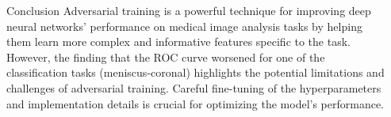 \documentclass[final]{beamer}
\newlength{\sepwidth}
\newlength{\colwidth}
\newcommand{\separatorcolumn}{\begin{column}{\sepwidth}\end{column}}
\begin{document}
\begin{frame}[t]
\begin{columns}[t]
\begin{column}{\colwidth}
\begin{block}{Conclusion}
    Adversarial training is a powerful technique for improving deep neural networks' performance on medical image analysis tasks by helping them learn more complex and informative features specific to the task. However, the finding that the ROC curve worsened for one of the classification tasks (meniscus-coronal) highlights the potential limitations and challenges of adversarial training. Careful fine-tuning of the hyperparameters and implementation details is crucial for optimizing the model's performance.

  
  \end{block}
  

\end{column}
\separatorcolumn



\end{columns}
\end{frame}
\end{document}
